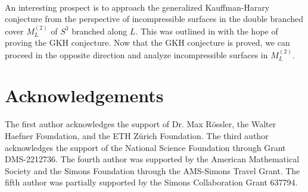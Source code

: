 \documentclass[11pt]{amsart}
\begin{document}
\ 

An interesting prospect is to approach the generalized Kauffman-Harary conjecture from the perspective of incompressible surfaces in the double branched cover $M^{(2)}_L$ of $S^3$ branched along $L$. This was outlined in \cite{APS} with the hope of proving the GKH conjecture. Now that the GKH conjecture is proved, we can proceed in the opposite direction and analyze incompressible surfaces in $M^{(2)}_L$.

\section*{Acknowledgements}

The first author acknowledges the support of Dr. Max Rössler, the Walter Haefner Foundation, and the ETH Zürich Foundation. The third author acknowledges the support of the National Science Foundation through Grant DMS-2212736. The fourth author was supported by the American Mathematical Society and the Simons Foundation through the AMS-Simons Travel Grant. The fifth author was partially supported by the Simons Collaboration Grant 637794.
\end{document}
